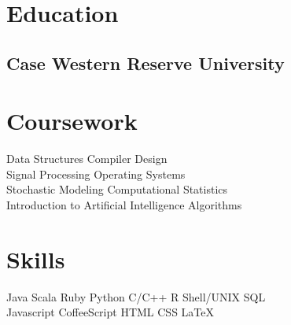 \documentclass[]{deedy-resume-openfont}
\begin{document}
%
%



\begin{minipage}[t]{0.49\textwidth}


\section{Education}
\subsection{Case Western Reserve University}
\sectionsep


\end{minipage}
\hfill
\begin{minipage}[t]{0.49\textwidth}



\section{Coursework}
\begin{spacing}{1.5}
Data Structures \textbullet{} Compiler Design \\
Signal Processing \textbullet{} Operating Systems \\
Stochastic Modeling \textbullet{} Computational Statistics \\
Introduction to Artificial Intelligence \textbullet{} Algorithms \\
\end{spacing}
\end{minipage}


\vspace{-20pt}
\section{Skills}
 \descript{}
\vspace{1pt}
Java \textbullet{} Scala \textbullet{} Ruby \textbullet{} Python \textbullet{} C/C++ \textbullet{} R \textbullet{} Shell/UNIX \textbullet{} SQL \\
Javascript \textbullet{} CoffeeScript \textbullet{} HTML \textbullet{} CSS \textbullet{} \LaTeX
\sectionsep
\end{document}
